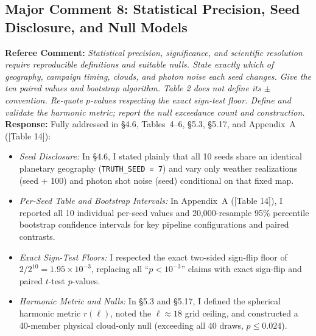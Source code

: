\documentclass[11pt]{article}
\begin{document}
\subsection*{Major Comment 8: Statistical Precision, Seed Disclosure, and Null Models}
\textbf{Referee Comment:} \textit{Statistical precision, significance, and scientific resolution require reproducible definitions and suitable nulls. State exactly which of geography, campaign timing, clouds, and photon noise each seed changes. Give the ten paired values and bootstrap algorithm. Table 2 does not define its $\pm$ convention. Re-quote $p$-values respecting the exact sign-test floor. Define and validate the harmonic metric; report the null exceedance count and construction.}\\
\textbf{Response:} Fully addressed in §4.6, Tables~4--6, §5.3, §5.17, and Appendix~A ([Table 14]):
\begin{itemize}
    \item \textit{Seed Disclosure:} In §4.6, I stated plainly that all 10 seeds share an identical planetary geography (\texttt{TRUTH\_SEED = 7}) and vary only weather realizations (seed + 100) and photon shot noise (seed) conditional on that fixed map.
    \item \textit{Per-Seed Table and Bootstrap Intervals:} In Appendix~A ([Table 14]), I reported all 10 individual per-seed values and 20,000-resample 95\% percentile bootstrap confidence intervals for key pipeline configurations and paired contrasts.
    \item \textit{Exact Sign-Test Floors:} I respected the exact two-sided sign-flip floor of $2/2^{10} = 1.95\times 10^{-3}$, replacing all ``$p < 10^{-3}$'' claims with exact sign-flip and paired $t$-test $p$-values.
    \item \textit{Harmonic Metric and Nulls:} In §5.3 and §5.17, I defined the spherical harmonic metric $r(\ell)$, noted the $\ell \approx 18$ grid ceiling, and constructed a 40-member physical cloud-only null (exceeding all 40 draws, $p \le 0.024$).
\end{itemize}
\end{document}
